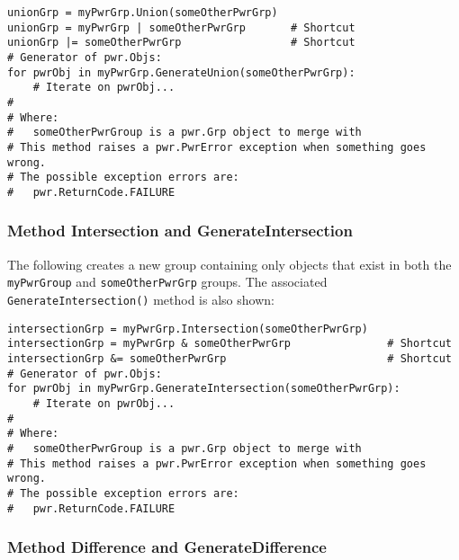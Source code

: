 \begin{center}\begin{minipage}{.95\linewidth}\begin{lstlisting}
unionGrp = myPwrGrp.Union(someOtherPwrGrp)
unionGrp = myPwrGrp | someOtherPwrGrp       # Shortcut
unionGrp |= someOtherPwrGrp                 # Shortcut
# Generator of pwr.Objs:
for pwrObj in myPwrGrp.GenerateUnion(someOtherPwrGrp):
    # Iterate on pwrObj...
#
# Where:
#   someOtherPwrGroup is a pwr.Grp object to merge with
# This method raises a pwr.PwrError exception when something goes wrong.
# The possible exception errors are:
#   pwr.ReturnCode.FAILURE
\end{lstlisting}\end{minipage}\end{center}

\subsubsection{Method Intersection and GenerateIntersection}
\label{meth:Intersection}

The following creates a new group containing only objects that exist in both the
\texttt{myPwrGroup} and \texttt{someOtherPwrGrp} groups. The associated
\texttt{GenerateIntersection()} method is also shown:

\begin{center}\begin{minipage}{.95\linewidth}\begin{lstlisting}
intersectionGrp = myPwrGrp.Intersection(someOtherPwrGrp)
intersectionGrp = myPwrGrp & someOtherPwrGrp               # Shortcut
intersectionGrp &= someOtherPwrGrp                         # Shortcut
# Generator of pwr.Objs:
for pwrObj in myPwrGrp.GenerateIntersection(someOtherPwrGrp):
    # Iterate on pwrObj...
#
# Where:
#   someOtherPwrGroup is a pwr.Grp object to merge with
# This method raises a pwr.PwrError exception when something goes wrong.
# The possible exception errors are:
#   pwr.ReturnCode.FAILURE
\end{lstlisting}\end{minipage}\end{center}

\subsubsection{Method Difference and GenerateDifference} \label{meth:Difference}

